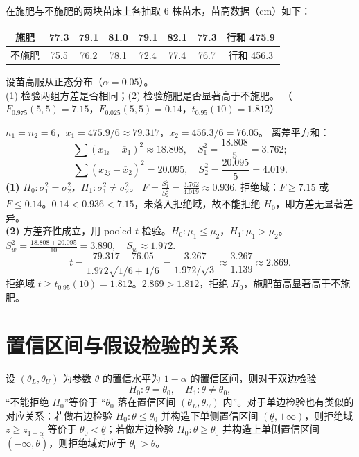 \documentclass[lang=cn,11pt]{elegantbook}
\begin{document}
\begin{exercise} \label{ex:ht_f_pooled}
在施肥与不施肥的两块苗床上各抽取 6 株苗木，苗高数据（cm）如下：
\begin{center}
\begin{tabular}{ccccccc|c}
\toprule
施肥 & 77.3 & 79.1 & 81.0 & 79.1 & 82.1 & 77.3 & 行和 475.9 \\
\midrule
不施肥 & 75.5 & 76.2 & 78.1 & 72.4 & 77.4 & 76.7 & 行和 456.3 \\
\bottomrule
\end{tabular}
\end{center}
设苗高服从正态分布（\(\alpha=0.05\)）。\\
(1) 检验两组方差是否相同；(2) 检验施肥是否显著高于不施肥。
（\(F_{0.975}(5,5)=7.15\)，\(F_{0.025}(5,5)=0.14\)，\(t_{0.95}(10)=1.812\)）
\end{exercise}
\begin{solution}
\(n_1=n_2=6\)，\(\overline{x}_1=475.9/6\approx79.317\)，\(\overline{x}_2=456.3/6=76.05\)。
离差平方和：
\[
\sum(x_{1i}-\overline{x}_1)^2\approx18.808,\quad S_1^2=\frac{18.808}{5}=3.762;
\]
\[
\sum(x_{2j}-\overline{x}_2)^2=20.095,\quad S_2^2=\frac{20.095}{5}=4.019.
\]
\textbf{(1)} \(H_0\colon\sigma_1^2=\sigma_2^2\)，\(H_1\colon\sigma_1^2\neq\sigma_2^2\)。
\(
F=\frac{S_1^2}{S_2^2}=\frac{3.762}{4.019}\approx0.936.
\)
拒绝域：\(F\geq7.15\) 或 \(F\leq0.14\)。\(0.14<0.936<7.15\)，未落入拒绝域，故不能拒绝 \(H_0\)，即方差无显著差异。\\
\textbf{(2)} 方差齐性成立，用 pooled \(t\) 检验。\(H_0\colon\mu_1\leq\mu_2\)，\(H_1\colon\mu_1>\mu_2\)。
\(
S_w^2=\frac{18.808+20.095}{10}=3.890,\quad S_w\approx1.972.
\)
\[
t=\frac{79.317-76.05}{1.972\sqrt{1/6+1/6}}=\frac{3.267}{1.972/\sqrt{3}}\approx\frac{3.267}{1.139}\approx2.869.
\]
拒绝域 \(t\geq t_{0.95}(10)=1.812\)。\(2.869>1.812\)，拒绝 \(H_0\)，施肥苗高显著高于不施肥。
\end{solution}



\section{置信区间与假设检验的关系} \label{sec:ht-ci}

\begin{property}[置信区间与假设检验的等价性]\label{prop:ci-test-equiv}
设 \((\theta_L, \theta_U)\) 为参数 \(\theta\) 的置信水平为 \(1-\alpha\) 的置信区间，则对于双边检验
\[
H_0\colon \theta=\theta_0,\quad H_1\colon \theta\neq\theta_0,
\]
“不能拒绝 \(H_0\)”等价于 “\(\theta_0\) 落在置信区间 \((\theta_L, \theta_U)\) 内”。对于单边检验也有类似的对应关系：若做右边检验 \(H_0\colon \theta\leq\theta_0\) 并构造下单侧置信区间 \((\underline{\theta},+\infty)\)，则拒绝域 \(z\geq z_{1-\alpha}\) 等价于 \(\theta_0<\underline{\theta}\)；若做左边检验 \(H_0\colon \theta\geq\theta_0\) 并构造上单侧置信区间 \((-\infty,\overline{\theta})\)，则拒绝域对应于 \(\theta_0>\overline{\theta}\)。
\end{property}
\end{document}
